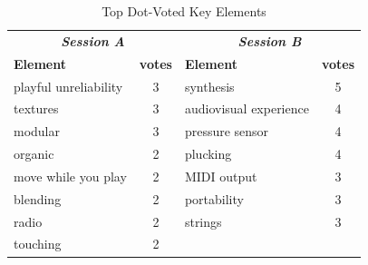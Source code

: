 \documentclass[letterpaper, 12pt]{article}
\begin{document}
\begin{table}[htbp]
    \centering
    \caption{Top Dot-Voted Key Elements}
    \begin{tabular}{lc|lc}
        \hline
        \multicolumn{2}{c|}{\textbf{\emph{Session A}}} &
        \multicolumn{2}{c}{\textbf{\emph{Session B}}} \\
        \textbf{Element} & \textbf{votes} &
        \textbf{Element} & \textbf{votes} \\
        \hline
        playful unreliability & 3 & synthesis & 5 \\
        textures & 3 & audiovisual experience & 4 \\
        modular & 3 & pressure sensor & 4 \\
        organic & 2 & plucking & 4 \\
        move while you play & 2 & MIDI output & 3 \\
        blending & 2 & portability & 3 \\
        radio & 2 & strings & 3 \\
        touching & 2 & & \\
        \hline
    \end{tabular}
    \label{ch3-tab:dot-voting}
    
\end{table}

\end{document}
